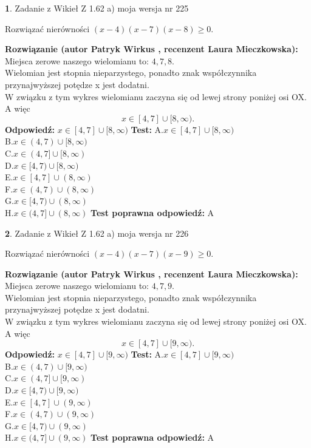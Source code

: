 \documentclass[12pt, a4paper]{article}
\theoremstyle{definition} %
\newtheorem{zad}{}
\newcommand{\zadStart}[1]{\begin{zad}#1\newline}
\newcommand{\zadStop}{\end{zad}}
\newcommand{\rozwStart}[2]{\noindent \textbf{Rozwiązanie (autor #1 , recenzent #2): }\newline}
\newcommand{\rozwStop}{\newline}
\newcommand{\odpStart}{\noindent \textbf{Odpowiedź:}\newline}
\newcommand{\odpStop}{\newline}
\newcommand{\testStart}{\noindent \textbf{Test:}\newline}
\newcommand{\testStop}{\newline}
\newcommand{\kluczStart}{\noindent \textbf{Test poprawna odpowiedź:}\newline}
\newcommand{\kluczStop}{\newline}
\begin{document}
\zadStart{Zadanie z Wikieł Z 1.62 a) moja wersja nr 225}

Rozwiązać nierówności $(x-4)(x-7)(x-8)\ge0$.
\zadStop
\rozwStart{Patryk Wirkus}{Laura Mieczkowska}
Miejsca zerowe naszego wielomianu to: $4, 7, 8$.\\
Wielomian jest stopnia nieparzystego, ponadto znak współczynnika przy\linebreak najwyższej potędze x jest dodatni.\\ W związku z tym wykres wielomianu zaczyna się od lewej strony poniżej osi OX. A więc $$x \in [4,7] \cup [8,\infty).$$
\rozwStop
\odpStart
$x \in [4,7] \cup [8,\infty)$
\odpStop
\testStart
A.$x \in [4,7] \cup [8,\infty)$\\
B.$x \in (4,7) \cup [8,\infty)$\\
C.$x \in (4,7] \cup [8,\infty)$\\
D.$x \in [4,7) \cup [8,\infty)$\\
E.$x \in [4,7] \cup (8,\infty)$\\
F.$x \in (4,7) \cup (8,\infty)$\\
G.$x \in [4,7) \cup (8,\infty)$\\
H.$x \in (4,7] \cup (8,\infty)$
\testStop
\kluczStart
A
\kluczStop



\zadStart{Zadanie z Wikieł Z 1.62 a) moja wersja nr 226}

Rozwiązać nierówności $(x-4)(x-7)(x-9)\ge0$.
\zadStop
\rozwStart{Patryk Wirkus}{Laura Mieczkowska}
Miejsca zerowe naszego wielomianu to: $4, 7, 9$.\\
Wielomian jest stopnia nieparzystego, ponadto znak współczynnika przy\linebreak najwyższej potędze x jest dodatni.\\ W związku z tym wykres wielomianu zaczyna się od lewej strony poniżej osi OX. A więc $$x \in [4,7] \cup [9,\infty).$$
\rozwStop
\odpStart
$x \in [4,7] \cup [9,\infty)$
\odpStop
\testStart
A.$x \in [4,7] \cup [9,\infty)$\\
B.$x \in (4,7) \cup [9,\infty)$\\
C.$x \in (4,7] \cup [9,\infty)$\\
D.$x \in [4,7) \cup [9,\infty)$\\
E.$x \in [4,7] \cup (9,\infty)$\\
F.$x \in (4,7) \cup (9,\infty)$\\
G.$x \in [4,7) \cup (9,\infty)$\\
H.$x \in (4,7] \cup (9,\infty)$
\testStop
\kluczStart
A
\kluczStop
\end{document}
